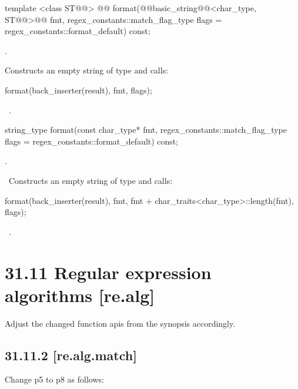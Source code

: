 \documentclass[ebook,11pt,article]{memoir}
\begin{document}
\begin{itemdecl}
template <class ST@@>
  @@
  format(@@basic_string@@<char_type, ST@@>@\removed{\&}@ fmt,
         regex_constants::match_flag_type flags =
           regex_constants::format_default) const;
\end{itemdecl}

\begin{itemdescr}
\pnum
\requires {}.

\pnum
\effects
Constructs an empty string  of type  and
calls:
\begin{codeblock}
format(back_inserter(result), fmt, flags);
\end{codeblock}

\pnum
\returns\ .
\end{itemdescr}

\begin{removedblock}
\begin{itemdecl}
string_type
  format(const char_type* fmt,
         regex_constants::match_flag_type flags =
           regex_constants::format_default) const;
\end{itemdecl}

\begin{itemdescr}
\pnum
\requires {}.

\pnum
\effects\ Constructs an empty string  of type  and
calls:
\begin{codeblock}
format(back_inserter(result),
       fmt, fmt + char_traits<char_type>::length(fmt), flags);
\end{codeblock}

\pnum
\returns\ .
\end{itemdescr}
\end{removedblock}

\section{31.11 Regular expression algorithms [re.alg]}
Adjust the changed function apis from the synopsis accordingly.
\subsection{31.11.2 [re.alg.match]}
Change p5 to p8 as follows:
\end{document}
